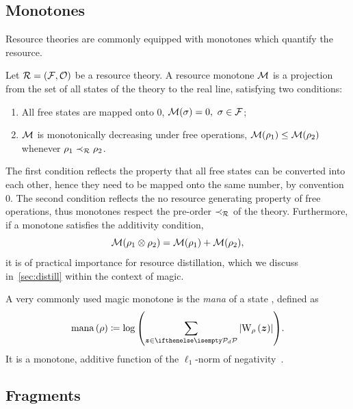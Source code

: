 \documentclass[pra,
aps,
twocolumn,
superscriptaddress,
groupedaddress,
nofootinbib,
reprint
]{revtex4-1}
\begin{document}
\subsection{Monotones}\label{sec:mono}

Resource theories are commonly equipped with monotones which quantify the resource. 
\begin{definition}\label{def:mono}
    Let $\mathcal{R} = (\mathcal{F}, \mathcal{O})$ be a resource theory.
    A resource monotone $\mathcal{M}$ is a projection from the set of all states of the theory to the real line, satisfying two conditions:
    \begin{enumerate}
        \item All free states are mapped onto 0, $\mathcal{M}(\sigma) = 0,\ \sigma \in \mathcal{F}$; 
        \item $\mathcal{M}$ is monotonically decreasing under free operations, $\mathcal{M}(\rho_1) \leq \mathcal{M}(\rho_2)$ whenever $\rho_1 \prec_{\mathcal{R}} \rho_2$.
    \end{enumerate}
\end{definition}
The first condition reflects the property that all free states can be converted into each other, hence they need to be mapped onto the same number, by convention 0.
The second condition reflects the no resource generating property of free operations, thus monotones respect the pre-order $\prec_{\mathcal{R}}$ of the theory.
Furthermore, if a monotone satisfies the additivity condition,
\begin{equation}
    \mathcal{M}(\rho_1 \otimes \rho_2) = \mathcal{M}(\rho_1) + \mathcal{M}(\rho_2),
\end{equation}
it is of practical importance for resource distillation, which we discuss in~\cref{sec:distill} within the context of magic.

A very commonly used magic monotone is the \emph{mana} of a state , defined as
\begin{equation}
    \mana{\rho} \coloneqq \log{\left(\sum\limits_{\bmz \in \pd} \abs{\W[\bmz]{\rho}}\right)}.
\end{equation}
It is a monotone, additive function of the $\ell_1$-norm of negativity~.

\subsection{Fragments}
\end{document}
